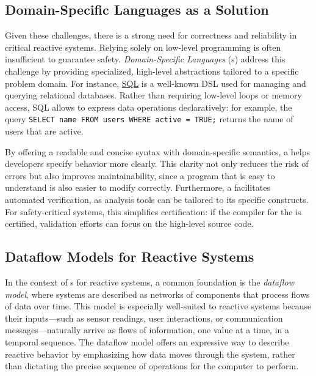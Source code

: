 \subsection{Domain-Specific Languages as a Solution}
\label{sec:intro:dsl:solution}

Given these challenges, there is a strong need for correctness and reliability in critical reactive
systems. Relying solely on low-level programming is often insufficient to guarantee safety.
\emph{Domain-Specific Languages} (\dsl{}s) address this challenge by providing specialized,
high-level abstractions tailored to a specific problem domain.
%
For instance, \href{https://en.wikipedia.org/wiki/SQL}{SQL} is a well-known DSL used for managing
and querying relational databases. Rather than requiring low-level loops or memory access, SQL
allows to express data operations declaratively: for example, the query
\texttt{SELECT name FROM users WHERE active = TRUE;} returns the name of users that are active.

By offering a readable and concise syntax with domain-specific semantics, a \dsl helps developers
specify behavior more clearly. This clarity not only reduces the risk of errors but also improves
maintainability, since a program that is easy to understand is also easier to modify correctly.
Furthermore, a \dsl facilitates automated verification, as analysis tools can be tailored to its
specific constructs. For safety-critical systems, this simplifies certification: if the compiler for
the \dsl is certified, validation efforts can focus on the high-level source code.

\subsection{Dataflow Models for Reactive Systems}
\label{sec:intro:dsl:dataflow}

In the context of \dsl{}s for reactive systems, a common foundation is the \emph{dataflow model},
where systems are described as networks of components that process flows of data over time. This
model is especially well-suited to reactive systems because their inputs---such as sensor readings,
user interactions, or communication messages---naturally arrive as flows of information, one value
at a time, in a temporal sequence. The dataflow model offers an expressive way to describe reactive
behavior by emphasizing how data moves through the system, rather than dictating the precise
sequence of operations for the computer to perform.


